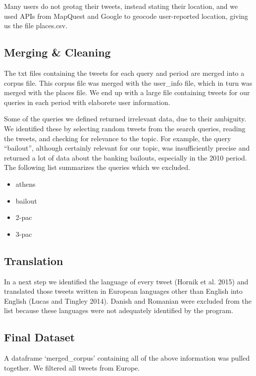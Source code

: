 \documentclass[]{article}
\begin{document}
Many users do not geotag their tweets, instead stating their location,
and we used APIs from MapQuest and Google to geocode user-reported
location, giving us the file places.csv.

\subsection{Merging \& Cleaning}\label{merging-cleaning}

The txt files containing the tweets for each query and period are merged
into a corpus file. This corpus file was merged with the user\_info
file, which in turn was merged with the places file. We end up with a
large file containing tweets for our queries in each period with
elaborete user information.

Some of the queries we defined returned irrelevant data, due to their
ambiguity. We identified these by selecting random tweets from the
search queries, reading the tweets, and checking for relevance to the
topic. For example, the query ``bailout'', although certainly relevant
for our topic, was insufficiently precise and returned a lot of data
about the banking bailouts, especially in the 2010 period. The following
list summarizes the queries which we excluded.

\begin{itemize}
\itemsep1pt\parskip0pt
\item
  athens
\item
  bailout
\item
  2-pac
\item
  3-pac
\end{itemize}

\subsection{Translation}\label{translation}

In a next step we identified the language of every tweet (Hornik et al.
2015) and translated those tweets written in European languages other
than English into English (Lucas and Tingley 2014). Danish and Romanian
were excluded from the list because these languages were not adequately
identified by the program.

\subsection{Final Dataset}\label{final-dataset}

A dataframe `merged\_corpus' containing all of the above information was
pulled together. We filtered all tweets from Europe.
\end{document}
